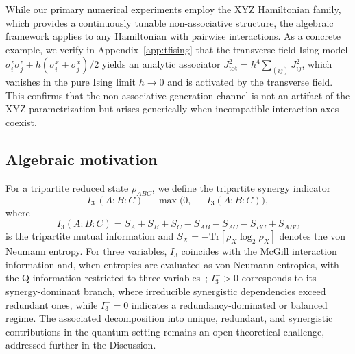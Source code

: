 \documentclass[aps,physrev,preprint,groupedaddress]{revtex4-2}
\begin{document}
While our primary numerical experiments employ the XYZ Hamiltonian family, which provides a continuously tunable non-associative structure, the algebraic framework applies to any Hamiltonian with pairwise interactions. As a concrete example, we verify in Appendix~\ref{app:tfising} that the transverse-field Ising model $\sigma_i^z \sigma_j^z + h(\sigma_i^x + \sigma_j^x)/2$ yields an analytic associator $J_{\mathrm{tot}}^2 = h^4 \sum_{(ij)} J_{ij}^2$, which vanishes in the pure Ising limit $h \to 0$ and is activated by the transverse field. This confirms that the non-associative generation channel is not an artifact of the XYZ parametrization but arises generically when incompatible interaction axes coexist.


\subsection{Algebraic motivation}
For a tripartite reduced state $\rho_{ABC}$, we define the tripartite synergy indicator
\begin{equation}\label{eq:I3minus}
    I_3^-(A{:}B{:}C) \equiv \max\!\big(0,\;-I_3(A{:}B{:}C)\big),
\end{equation}
where
\begin{equation}
    I_3(A{:}B{:}C) = S_A + S_B + S_C - S_{AB} - S_{AC} - S_{BC} + S_{ABC}
\end{equation}
is the tripartite mutual information and $S_X = -\mathrm{Tr}[\rho_X\log_2\rho_X]$ denotes the von Neumann entropy. For three variables, $I_3$ coincides with the McGill interaction information and, when entropies are evaluated as von Neumann entropies, with the Q-information restricted to three variables~\cite{rosas2019Oinfo, javarone2024QuantifyingHighorder}; $I_3^- > 0$ corresponds to its synergy-dominant branch, where irreducible synergistic dependencies exceed redundant ones, while $I_3^- = 0$ indicates a redundancy-dominated or balanced regime. The associated decomposition into unique, redundant, and synergistic contributions in the quantum setting remains an open theoretical challenge, addressed further in the Discussion.
\end{document}
